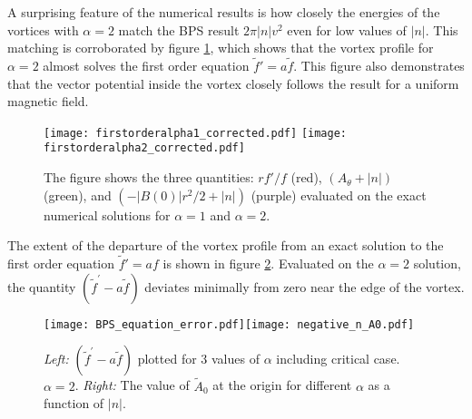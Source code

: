 \documentclass[12pt,a4paper]{article}
\begin{document}
A surprising feature of the numerical results is how closely the energies of the vortices with $\alpha=2$  match the BPS result $2\pi |n| v^2$ even for low values of $|n|$. This matching is corroborated by  figure \ref{fig:firstorder}, which shows that the vortex profile for $\alpha=2$  almost solves the first order equation $\tilde f' = a \tilde f$. This figure also demonstrates that the vector potential inside the vortex closely follows the result for a uniform magnetic field.
\begin{figure}[h]
\begin{center}
    \texttt{[image: firstorderalpha1\_corrected.pdf]} \hspace{0.1in}
      \texttt{[image: firstorderalpha2\_corrected.pdf]} 
    \caption{{\small The figure shows the three quantities: $rf'/f$ (red), $\left(A_\theta+|n|\right)$ (green), and $\left(-|B(0)|r^2/2+|n|\right)$ (purple) evaluated on the exact numerical solutions for $\alpha=1$ and $\alpha=2$.}} \label{fig:firstorder}
    \end{center}
\end{figure}
The extent of the departure of the vortex profile from an exact solution to the  first order equation $\tilde f'=a f$ is shown in figure \ref{fig:error}.  Evaluated on the $\alpha=2$ solution, the quantity $(\tilde f^\prime - a \tilde f)$ deviates minimally from zero near the edge of the vortex.
\begin{figure}[h]
\begin{center}
    \texttt{[image: BPS\_equation\_error.pdf]}\qquad\texttt{[image: negative\_n\_A0.pdf]}
     \caption{{\small {\it Left: }$\left(\tilde f^\prime - a \tilde f\right)$ plotted for 3 values of $\alpha$ including critical case. $\alpha=2$. {\it Right:} The value of $\tilde A_0$ at the origin for different $\alpha$ as a function of $|n|$. }} \label{fig:error}
    \end{center}
\end{figure}
\end{document}
